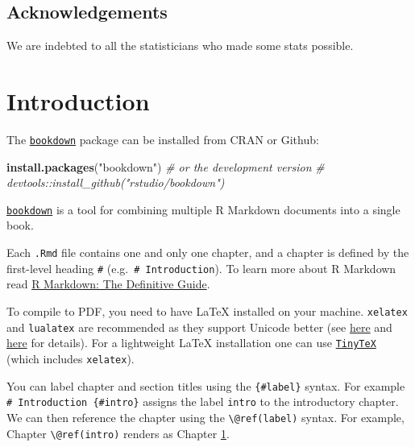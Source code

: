 \documentclass[
]{book}
\newenvironment{Shaded}{\begin{snugshade}}{\end{snugshade}}
\newcommand{\CommentTok}[1]{\textcolor[rgb]{0.56,0.35,0.01}{\textit{#1}}}
\newcommand{\KeywordTok}[1]{\textcolor[rgb]{0.13,0.29,0.53}{\textbf{#1}}}
\newcommand{\NormalTok}[1]{#1}
\newcommand{\StringTok}[1]{\textcolor[rgb]{0.31,0.60,0.02}{#1}}
\theoremstyle{definition}
\theoremstyle{definition}
\theoremstyle{definition}
\theoremstyle{remark}
\begin{document}
\hypertarget{acknowledgements}{%
\section*{Acknowledgements}\label{acknowledgements}}

We are indebted to all the statisticians who made some stats possible.

\hypertarget{intro}{%
\chapter{Introduction}\label{intro}}

The \href{https://bookdown.org/yihui/bookdown/}{\texttt{bookdown}} package can be installed from CRAN or Github:

\begin{Shaded}
\begin{Highlighting}[]
\KeywordTok{install.packages}\NormalTok{(}\StringTok{"bookdown"}\NormalTok{)}
\CommentTok{# or the development version}
\CommentTok{# devtools::install_github("rstudio/bookdown")}
\end{Highlighting}
\end{Shaded}

\href{https://bookdown.org/yihui/bookdown/}{\texttt{bookdown}} is a tool for combining multiple R Markdown documents into a single book.

Each \texttt{.Rmd} file contains one and only one chapter, and a chapter is defined by the first-level heading \texttt{\#} (e.g.~\texttt{\#\ Introduction}).
To learn more about R Markdown read \href{https://bookdown.org/yihui/rmarkdown/}{R Markdown: The Definitive Guide}.

To compile to PDF, you need to have LaTeX installed on your machine. \texttt{xelatex} and \texttt{lualatex} are recommended as they support Unicode better
(see \href{https://tex.stackexchange.com/questions/3393/what-is-xetex-exactly-and-why-should-i-use-it}{here} and \href{https://tex.stackexchange.com/questions/36/differences-between-luatex-context-and-xetex}{here} for details).
For a lightweight LaTeX installation one can use \href{https://yihui.org/tinytex/}{\texttt{TinyTeX}} (which includes \texttt{xelatex}).

You can label chapter and section titles using the \texttt{\{\#label\}} syntax. For example \texttt{\#\ Introduction\ \{\#intro\}} assigns the label \texttt{intro} to the introductory chapter.
We can then reference the chapter using the \texttt{\textbackslash{}@ref(label)} syntax. For example, Chapter \texttt{\textbackslash{}@ref(intro)} renders as Chapter \ref{intro}.
\end{document}

